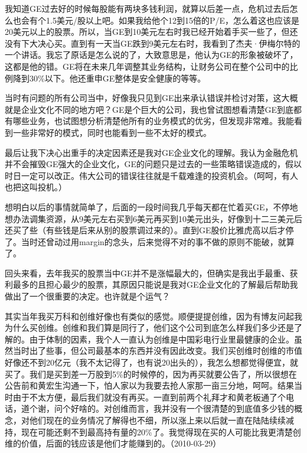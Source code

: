 我知道GE过去好的时候每股能有两块多钱利润，就算以后差一点，危机过去后怎么也会有个1.5美元/股以上吧。如果我给他个12到15倍的P/E，怎么着这也应该是20美元以上的股票。所以，当GE到10美元左右时我已经开始着手买一些了，但还没有下大决心买。直到有一天当GE跌到9美元左右时，我看到了杰夫·伊梅尔特的一个讲话。我忘了原话是怎么说的了，大致意思是，他认为GE的形象被破坏了，这都是他的错。GE将在未来几年调整其业务结构，让财务公司在整个公司中的比例降到30\%以下。他还重申GE整体是安全健康的等等。

当时有问题的所有公司当中，好像我只见到GE出来承认错误并检讨对策，这大概就是企业文化不同的地方吧？GE是个巨大的公司，我也曾试图想看清楚GE到底都有哪些业务，也试图想分析清楚他所有的业务模式的优劣，但发现非常难。我能看到一些非常好的模式，同时也能看到一些不太好的模式。

最后让我下决心出重手的决定因素还是我对GE企业文化的理解。我认为金融危机并不会摧毁GE强大的企业文化，GE的问题只是过去的一些策略错误造成的，假以时日一定可以改正。伟大公司的错误往往就是千载难逢的投资机会。（呵呵，有人也把这叫投机。）

想明白以后的事情就简单了，后面的一段时间我几乎每天都在忙着买GE，不停地想办法调集资源，从9美元左右买到6美元再买到10美元出头，好像到十二三美元后还买了些（有些钱是后来从别的股票调过来的）。直到GE股价比雅虎高以后才停了。当时还曾动过用margin的念头，后来觉得不对的事不做的原则不能破，就算了。

回头来看，去年我买的股票当中GE并不是涨幅最大的，但确实是我出手最重、获利最多的且担心最少的股票，其原因只能说是我对GE企业文化的了解最后帮助我做出了一个很重要的决定。也许就是个运气？

其实当年我买万科和创维好像也有类似的感觉。顺便提提创维，因为有博友问起我为什么买创维。创维和我们算是同行了，他们这个公司到底怎么样我们多少还是了解的。由于体制的因素，我个人一直认为创维是中国彩电行业里最健康的企业。虽然当时出了些事，但公司最基本的东西并没有因此改变。我们买创维时创维的市值好像还不到20亿元（我不太记得了，也有说20出头的），我怎么想都觉得便宜，就买了。我们是买到差一万股到5\%的时候停的，因为再买就要公告了，所以很想在公告前和黄宏生沟通一下，怕人家以为我要去抢人家那一亩三分地，呵呵。结果当时由于不太方便，最后我们就没有再买。一直到前两个礼拜才和黄老板通了个电话，道个谢，问个好啥的。对创维而言，我并没有一个很清楚的到底值多少钱的概念，对他们现在的业务情况了解得也不细，所以涨上来以后就一直在陆陆续续减持，现在可能还剩不到最高持有量的20\%了。我觉得现在买的人可能比我更清楚创维的价值，后面的钱应该是他们才能赚到的。（2010-03-29）


